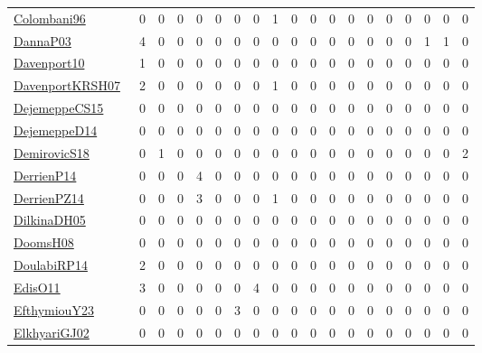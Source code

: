 {\begin{longtable}{l*{18}{r}}
\href{papers/Colombani96.pdf}{Colombani96}~\cite{Colombani96} & 0 & 0 & 0 & 0 & 0 & 0 & 0 & 1 & 0 & 0 & 0 & 0 & 0 & 0 & 0 & 0 & 0 & 0\\
\href{papers/DannaP03.pdf}{DannaP03}~\cite{DannaP03} & 4 & 0 & 0 & 0 & 0 & 0 & 0 & 0 & 0 & 0 & 0 & 0 & 0 & 0 & 0 & 1 & 1 & 0\\
\href{papers/Davenport10.pdf}{Davenport10}~\cite{Davenport10} & 1 & 0 & 0 & 0 & 0 & 0 & 0 & 0 & 0 & 0 & 0 & 0 & 0 & 0 & 0 & 0 & 0 & 0\\
\href{papers/DavenportKRSH07.pdf}{DavenportKRSH07}~\cite{DavenportKRSH07} & 2 & 0 & 0 & 0 & 0 & 0 & 0 & 1 & 0 & 0 & 0 & 0 & 0 & 0 & 0 & 0 & 0 & 0\\
\href{papers/DejemeppeCS15.pdf}{DejemeppeCS15}~\cite{DejemeppeCS15} & 0 & 0 & 0 & 0 & 0 & 0 & 0 & 0 & 0 & 0 & 0 & 0 & 0 & 0 & 0 & 0 & 0 & 0\\
\href{papers/DejemeppeD14.pdf}{DejemeppeD14}~\cite{DejemeppeD14} & 0 & 0 & 0 & 0 & 0 & 0 & 0 & 0 & 0 & 0 & 0 & 0 & 0 & 0 & 0 & 0 & 0 & 0\\
\href{papers/DemirovicS18.pdf}{DemirovicS18}~\cite{DemirovicS18} & 0 & 1 & 0 & 0 & 0 & 0 & 0 & 0 & 0 & 0 & 0 & 0 & 0 & 0 & 0 & 0 & 0 & 2\\
\href{papers/DerrienP14.pdf}{DerrienP14}~\cite{DerrienP14} & 0 & 0 & 0 & 4 & 0 & 0 & 0 & 0 & 0 & 0 & 0 & 0 & 0 & 0 & 0 & 0 & 0 & 0\\
\href{papers/DerrienPZ14.pdf}{DerrienPZ14}~\cite{DerrienPZ14} & 0 & 0 & 0 & 3 & 0 & 0 & 0 & 1 & 0 & 0 & 0 & 0 & 0 & 0 & 0 & 0 & 0 & 0\\
\href{papers/DilkinaDH05.pdf}{DilkinaDH05}~\cite{DilkinaDH05} & 0 & 0 & 0 & 0 & 0 & 0 & 0 & 0 & 0 & 0 & 0 & 0 & 0 & 0 & 0 & 0 & 0 & 0\\
\href{papers/DoomsH08.pdf}{DoomsH08}~\cite{DoomsH08} & 0 & 0 & 0 & 0 & 0 & 0 & 0 & 0 & 0 & 0 & 0 & 0 & 0 & 0 & 0 & 0 & 0 & 0\\
\href{papers/DoulabiRP14.pdf}{DoulabiRP14}~\cite{DoulabiRP14} & 2 & 0 & 0 & 0 & 0 & 0 & 0 & 0 & 0 & 0 & 0 & 0 & 0 & 0 & 0 & 0 & 0 & 0\\
\href{papers/EdisO11.pdf}{EdisO11}~\cite{EdisO11} & 3 & 0 & 0 & 0 & 0 & 0 & 4 & 0 & 0 & 0 & 0 & 0 & 0 & 0 & 0 & 0 & 0 & 0\\
\href{papers/EfthymiouY23.pdf}{EfthymiouY23}~\cite{EfthymiouY23} & 0 & 0 & 0 & 0 & 0 & 3 & 0 & 0 & 0 & 0 & 0 & 0 & 0 & 0 & 0 & 0 & 0 & 0\\
\href{papers/ElkhyariGJ02.pdf}{ElkhyariGJ02}~\cite{ElkhyariGJ02} & 0 & 0 & 0 & 0 & 0 & 0 & 0 & 0 & 0 & 0 & 0 & 0 & 0 & 0 & 0 & 0 & 0 & 0\\

\end{longtable}}
